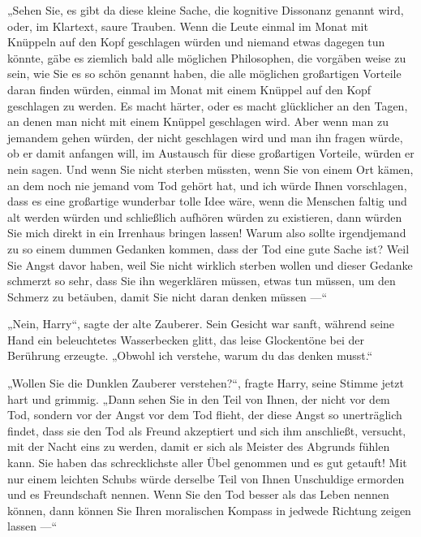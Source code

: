 „Sehen Sie, es gibt da diese kleine Sache, die kognitive Dissonanz genannt wird, oder, im Klartext, saure Trauben. Wenn die Leute einmal im Monat mit Knüppeln auf den Kopf geschlagen würden und niemand etwas dagegen tun könnte, gäbe es ziemlich bald alle möglichen Philosophen, die vorgäben weise zu sein, wie Sie es so schön genannt haben, die alle möglichen großartigen Vorteile daran finden würden, einmal im Monat mit einem Knüppel auf den Kopf geschlagen zu werden. Es macht härter, oder es macht glücklicher an den Tagen, an denen man nicht mit einem Knüppel geschlagen wird. Aber wenn man zu jemandem gehen würden, der nicht geschlagen wird und man ihn fragen würde, ob er damit anfangen will, im Austausch für diese großartigen Vorteile, würden er nein sagen. Und wenn Sie nicht sterben müssten, wenn Sie von einem Ort kämen, an dem noch nie jemand vom Tod gehört hat, und ich würde Ihnen vorschlagen, dass es eine großartige wunderbar tolle Idee wäre, wenn die Menschen faltig und alt werden würden und schließlich aufhören würden zu existieren, dann würden Sie mich direkt in ein Irrenhaus bringen lassen! Warum also sollte irgendjemand zu so einem dummen Gedanken kommen, dass der Tod eine gute Sache ist? Weil Sie Angst davor haben, weil Sie nicht wirklich sterben wollen und dieser Gedanke schmerzt so sehr, dass Sie ihn wegerklären müssen, etwas tun müssen, um den Schmerz zu betäuben, damit Sie nicht daran denken müssen —“

„Nein, Harry“, sagte der alte Zauberer. Sein Gesicht war sanft, während seine Hand ein beleuchtetes Wasserbecken glitt, das leise Glockentöne bei der Berührung erzeugte.
„Obwohl ich verstehe, warum du das denken musst.“

„Wollen Sie die Dunklen Zauberer verstehen?“, fragte Harry, seine Stimme jetzt hart und grimmig.
„Dann sehen Sie in den Teil von Ihnen, der nicht vor dem Tod, sondern vor der Angst vor dem Tod flieht, der diese Angst so unerträglich findet, dass sie den Tod als Freund akzeptiert und sich ihm anschließt, versucht, mit der Nacht eins zu werden, damit er sich als Meister des Abgrunds fühlen kann. Sie haben das schrecklichste aller Übel genommen und es gut getauft! Mit nur einem leichten Schubs würde derselbe Teil von Ihnen Unschuldige ermorden und es Freundschaft nennen. Wenn Sie den Tod besser als das Leben nennen können, dann können Sie Ihren moralischen Kompass in jedwede Richtung zeigen lassen —“

